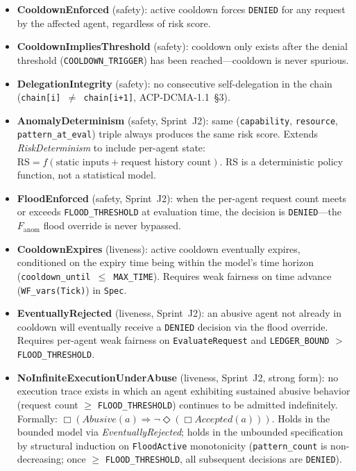 \documentclass[11pt]{article}
\theoremstyle{definition}
\begin{document}
\begin{itemize}[noitemsep]
  \item \textbf{CooldownEnforced} (safety): active cooldown forces \texttt{DENIED} for any
        request by the affected agent, regardless of risk score.
  \item \textbf{CooldownImpliesThreshold} (safety): cooldown only exists after the denial
        threshold (\texttt{COOLDOWN\_TRIGGER}) has been reached---cooldown is never spurious.
  \item \textbf{DelegationIntegrity} (safety): no consecutive self-delegation in the chain
        (\texttt{chain[i] $\neq$ chain[i+1]}, ACP-DCMA-1.1~\S3).
  \item \textbf{AnomalyDeterminism} (safety, Sprint~J2): same
        (\texttt{capability}, \texttt{resource}, \texttt{pattern\_at\_eval}) triple always produces
        the same risk score. Extends \textit{RiskDeterminism} to include per-agent state:
        $\text{RS} = f(\text{static inputs} + \text{request history count})$.
        RS is a deterministic policy function, not a statistical model.
  \item \textbf{FloodEnforced} (safety, Sprint~J2): when the per-agent request count meets
        or exceeds \texttt{FLOOD\_THRESHOLD} at evaluation time, the decision is
        \texttt{DENIED}---the $F_{\text{anom}}$ flood override is never bypassed.
  \item \textbf{CooldownExpires} (liveness): active cooldown eventually expires, conditioned on
        the expiry time being within the model's time horizon (\texttt{cooldown\_until $\leq$ MAX\_TIME}).
        Requires weak fairness on time advance (\texttt{WF\_vars(Tick)}) in \texttt{Spec}.
  \item \textbf{EventuallyRejected} (liveness, Sprint~J2): an abusive agent not already in
        cooldown will eventually receive a \texttt{DENIED} decision via the flood override.
        Requires per-agent weak fairness on \texttt{EvaluateRequest} and
        \texttt{LEDGER\_BOUND} $>$ \texttt{FLOOD\_THRESHOLD}.
  \item \textbf{NoInfiniteExecutionUnderAbuse} (liveness, Sprint~J2, strong form):
        no execution trace exists in which an agent exhibiting sustained abusive behavior
        (request count $\geq$ \texttt{FLOOD\_THRESHOLD}) continues to be admitted indefinitely.
        Formally: $\Box(\mathit{Abusive}(a) \Rightarrow \neg\Diamond(\Box\mathit{Accepted}(a)))$.
        Holds in the bounded model via \textit{EventuallyRejected}; holds in the unbounded
        specification by structural induction on \texttt{FloodActive} monotonicity
        (\texttt{pattern\_count} is non-decreasing; once $\geq$ \texttt{FLOOD\_THRESHOLD},
        all subsequent decisions are \texttt{DENIED}).
\end{itemize}
\end{document}
